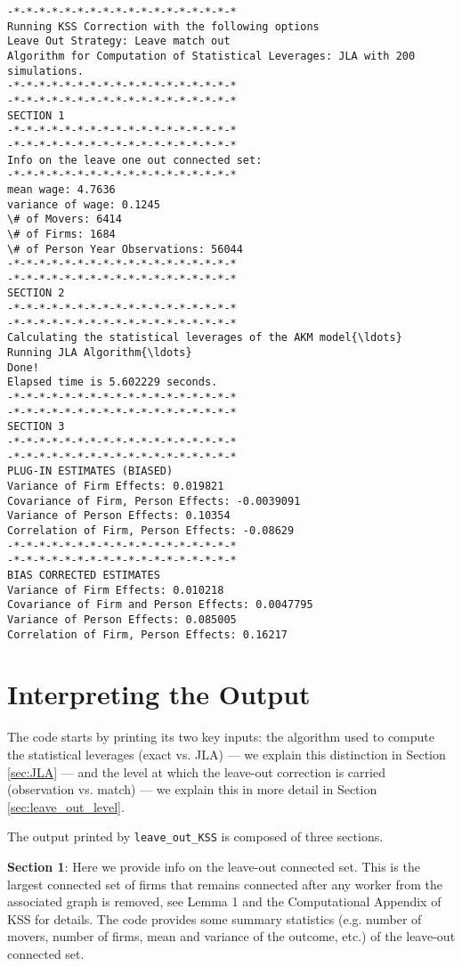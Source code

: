\documentclass[11pt]{article}
\begin{document}
    \begin{Verbatim}[commandchars=\\\{\}]
-*-*-*-*-*-*-*-*-*-*-*-*-*-*-*-*-*-*
Running KSS Correction with the following options
Leave Out Strategy: Leave match out
Algorithm for Computation of Statistical Leverages: JLA with 200 simulations.
-*-*-*-*-*-*-*-*-*-*-*-*-*-*-*-*-*-*
-*-*-*-*-*-*-*-*-*-*-*-*-*-*-*-*-*-*
SECTION 1
-*-*-*-*-*-*-*-*-*-*-*-*-*-*-*-*-*-*
-*-*-*-*-*-*-*-*-*-*-*-*-*-*-*-*-*-*
Info on the leave one out connected set:
-*-*-*-*-*-*-*-*-*-*-*-*-*-*-*-*-*-*
mean wage: 4.7636
variance of wage: 0.1245
\# of Movers: 6414
\# of Firms: 1684
\# of Person Year Observations: 56044
-*-*-*-*-*-*-*-*-*-*-*-*-*-*-*-*-*-*
-*-*-*-*-*-*-*-*-*-*-*-*-*-*-*-*-*-*
SECTION 2
-*-*-*-*-*-*-*-*-*-*-*-*-*-*-*-*-*-*
-*-*-*-*-*-*-*-*-*-*-*-*-*-*-*-*-*-*
Calculating the statistical leverages of the AKM model{\ldots}
Running JLA Algorithm{\ldots}
Done!
Elapsed time is 5.602229 seconds.
-*-*-*-*-*-*-*-*-*-*-*-*-*-*-*-*-*-*
-*-*-*-*-*-*-*-*-*-*-*-*-*-*-*-*-*-*
SECTION 3
-*-*-*-*-*-*-*-*-*-*-*-*-*-*-*-*-*-*
-*-*-*-*-*-*-*-*-*-*-*-*-*-*-*-*-*-*
PLUG-IN ESTIMATES (BIASED)
Variance of Firm Effects: 0.019821
Covariance of Firm, Person Effects: -0.0039091
Variance of Person Effects: 0.10354
Correlation of Firm, Person Effects: -0.08629
-*-*-*-*-*-*-*-*-*-*-*-*-*-*-*-*-*-*
-*-*-*-*-*-*-*-*-*-*-*-*-*-*-*-*-*-*
BIAS CORRECTED ESTIMATES
Variance of Firm Effects: 0.010218
Covariance of Firm and Person Effects: 0.0047795
Variance of Person Effects: 0.085005
Correlation of Firm, Person Effects: 0.16217
    \end{Verbatim}

    \hypertarget{interpreting-the-output}{%
\section{Interpreting the Output}\label{interpreting-the-output}}

The code starts by printing its two key inputs: the algorithm used to compute the statistical leverages (exact vs. JLA) --- we explain this distinction in Section \ref{sec:JLA} --- and the level at which the leave-out correction is carried (observation vs. match) --- we explain this in more detail in Section \ref{sec:leave_out_level}. 

The output printed by  \texttt{leave\_out\_KSS}  is composed of
three sections.

\textbf{Section 1}: Here we provide info on the leave-out connected set.
This is the largest connected set of firms that remains connected after
any worker from the associated graph is removed, see Lemma 1 and the
Computational Appendix of KSS for details.
The code provides some summary statistics (e.g. number of movers, number of
firms, mean and variance of the outcome, etc.) of the leave-out
connected set.
\end{document}
